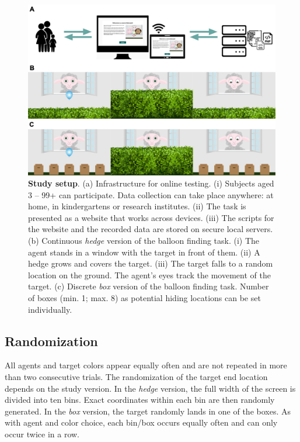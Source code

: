 \documentclass[
  man,floatsintext]{apa6}
\begin{document}
\begin{figure}

{\centering \includegraphics[width=1\linewidth]{../figures/gafo_procedure} 

}

\caption{\textbf{Study setup}.
(a) Infrastructure for online testing. (i) Subjects aged 3 -- 99+ can participate. Data collection can take place anywhere: at home, in kindergartens or research institutes. (ii) The task is presented as a website that works across devices. (iii) The scripts for the website and the recorded data are stored on secure local servers.
(b) Continuous \emph{hedge} version of the balloon finding task. (i) The agent stands in a window with the target in front of them. (ii) A hedge grows and covers the target. (iii) The target falls to a random location on the ground. The agent's eyes track the movement of the target.
(c) Discrete \emph{box} version of the balloon finding task. Number of boxes (min. 1; max. 8) as potential hiding locations can be set individually.}\label{fig:fig1}
\end{figure}

\hypertarget{randomization}{%
\subsection{Randomization}\label{randomization}}

All agents and target colors appear equally often and are not repeated in more than two consecutive trials. The randomization of the target end location depends on the study version. In the \emph{hedge} version, the full width of the screen is divided into ten bins. Exact coordinates within each bin are then randomly generated. In the \emph{box} version, the target randomly lands in one of the boxes. As with agent and color choice, each bin/box occurs equally often and can only occur twice in a row.
\end{document}
